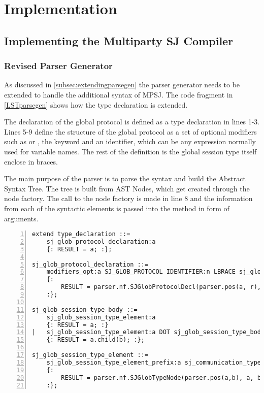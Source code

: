 \cleardoublepage
\chapter{Implementation}
\label{ch:implementation}

\section{Implementing the Multiparty SJ Compiler}

\subsection{Revised Parser Generator}
\label{subsec:ppgimpl}

As discussed in \autoref{subsec:extendingparsegen} the parser generator needs to be extended to handle the additional syntax of MPSJ. The code fragment in \autoref{LSTparsegen} shows how the type declaration is extended. 

The declaration of the global protocol is defined as a type declaration in lines 1-3. Lines 5-9 define the structure of the global protocol as a set of optional modifiers such as  or , the  keyword and an identifier, which can be any expression normally used for variable names. The rest of the definition is the global session type itself enclose in braces. 

The main purpose of the parser is to parse the syntax and build the Abstract Syntax Tree. The tree is built from AST Nodes, which get created through the node factory. The call to the node factory is made in line 8 and the information from each of the syntactic elements is passed into the method in form of arguments.  

\begin{lstlisting}[basicstyle=\LISTINGSTYLE, numbers=left, caption={Example code fragment showing the language extension to the parser generator}, label={LSTparsegen}]
extend type_declaration ::=
	sj_glob_protocol_declaration:a
	{: RESULT = a; :};

sj_glob_protocol_declaration ::=
	modifiers_opt:a SJ_GLOB_PROTOCOL IDENTIFIER:n LBRACE sj_glob_session_type_body:t RBRACE:r
	{: 
		RESULT = parser.nf.SJGlobProtocolDecl(parser.pos(a, r), a, parser.nf.Id(parser.pos(n), n.getIdentifier()), t); 
	:};

sj_glob_session_type_body ::= 
	sj_glob_session_type_element:a
	{: RESULT = a; :}
|	sj_glob_session_type_element:a DOT sj_glob_session_type_body:b
	{: RESULT = a.child(b); :};

sj_glob_session_type_element ::=
	sj_glob_session_type_element_prefix:a sj_communication_type_elem:b
	{: 
		RESULT = parser.nf.SJGlobTypeNode(parser.pos(a,b), a, b); 
	:};	
\end{lstlisting}

